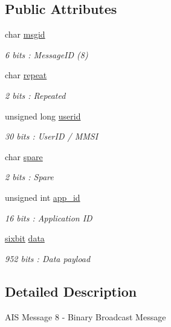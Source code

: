 \subsection*{Public Attributes}
\begin{DoxyCompactItemize}
\item 
char \mbox{\hyperlink{structaismsg__8_adc222cb89285a262627463a800d17abd}{msgid}}
\begin{DoxyCompactList}\small\item\em 6 bits \+: Message\+ID (8) \end{DoxyCompactList}\item 
char \mbox{\hyperlink{structaismsg__8_af47fdf710cf22896e221dadcf6f4d5c9}{repeat}}
\begin{DoxyCompactList}\small\item\em 2 bits \+: Repeated \end{DoxyCompactList}\item 
unsigned long \mbox{\hyperlink{structaismsg__8_a6360180e0963f7965b0584af6900c53a}{userid}}
\begin{DoxyCompactList}\small\item\em 30 bits \+: User\+ID / M\+M\+SI \end{DoxyCompactList}\item 
char \mbox{\hyperlink{structaismsg__8_a93279dd4cf452d1059570d2d544a192c}{spare}}
\begin{DoxyCompactList}\small\item\em 2 bits \+: Spare \end{DoxyCompactList}\item 
unsigned int \mbox{\hyperlink{structaismsg__8_a083a6bc8a91bc86c7a47b783cdaf2687}{app\+\_\+id}}
\begin{DoxyCompactList}\small\item\em 16 bits \+: Application ID \end{DoxyCompactList}\item 
\mbox{\hyperlink{structsixbit}{sixbit}} \mbox{\hyperlink{structaismsg__8_abc710e9927cccea052dc2cd139dd2364}{data}}
\begin{DoxyCompactList}\small\item\em 952 bits \+: Data payload \end{DoxyCompactList}\end{DoxyCompactItemize}


\subsection{Detailed Description}
A\+IS Message 8 -\/ Binary Broadcast Message 

